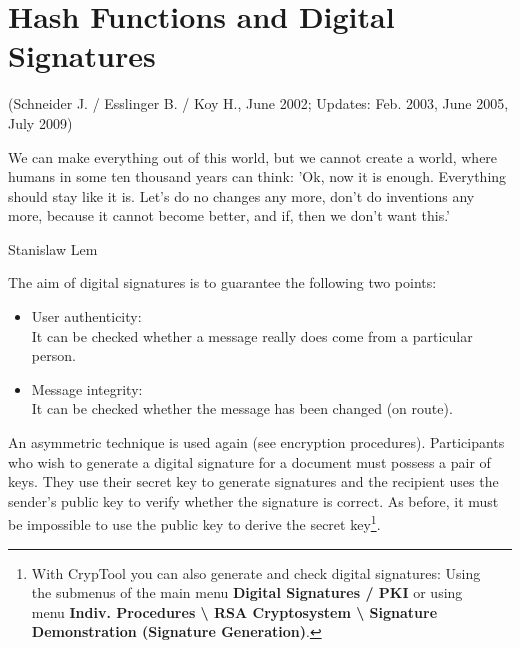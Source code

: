 
\newpage
\hypertarget{Chapter_Hashes-and-Digital-Signatures}{}
\chapter{Hash Functions and Digital Signatures}
\label{Chapter_Hashes-and-Digital-Signatures}
(Schneider J. / Esslinger B. / Koy H., June 2002;
Updates: Feb. 2003, June 2005, July 2009)
\begin{ctsquote}
We can make everything out of this world, but we cannot create a world,
where humans in some ten thousand years can think: 'Ok, now it is enough.
Everything should stay like it is. Let's do no changes any more, don't do
inventions any more, because it cannot become better, and if, then we
don't want this.'
\caption[Stanislaw Lem]{Stanislaw Lem\footnotemark}
\end{ctsquote}
\addtocounter{footnote}{0}


\noindent The aim of digital signatures is to guarantee the following two points:
\begin{itemize}
 \item User authenticity:  \\
      It can be checked whether a message really does
come from a particular person.
 \item Message integrity:   \\
      It can be checked whether the message has been
changed (on route).
\end{itemize}


An asymmetric technique is used again (see encryption procedures). Participants
who wish to generate a digital signature for a document must possess a pair of
keys. They use their secret key to generate signatures and the recipient uses
the sender's public key to verify whether the signature is correct. As before,
it must be impossible to use the public key to derive the secret key\footnote{%
With CrypTool you can also generate and check 
digital signatures: Using\\
the submenus of the main menu {\bf Digital Signatures / PKI}  or using\\
menu {\bf Indiv. Procedures \textbackslash{} RSA Cryptosystem 
\textbackslash{} Signature Demonstration (Signature Generation)}.
}.


